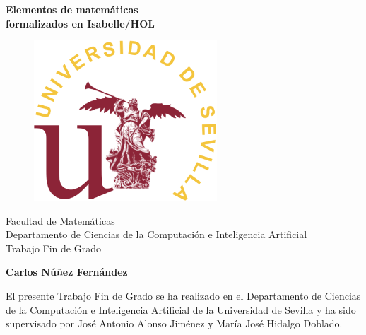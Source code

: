 \documentclass[12pt,a4paper,twoside]{book}
\begin{document}

\begin{titlepage}
 \vspace*{2cm}
  \begin{center}
    {\huge \textbf{Elementos de matemáticas \\ \vspace*{1em}
                   formalizados en Isabelle/HOL}}
  \end{center}
  \vspace{3cm}
  \begin{center}
    \begin{figure}[h]
    \centering
    \includegraphics[height=6cm]{sello.png}
    \end{figure}
  \vspace{3cm}
    {\normalsize Facultad de Matemáticas} \\
    {\normalsize Departamento de Ciencias de la Computación e Inteligencia Artificial}\\
    {\normalsize Trabajo Fin de Grado} \\
  \end{center}
  \begin{center}
    {\large \textbf{Carlos Núñez Fernández}}
  \end{center}
\end{titlepage}

\newpage

El presente Trabajo Fin de Grado se ha realizado en el Departamento de
Ciencias de la Computación e Inteligencia Artificial de la Universidad
de Sevilla y ha sido supervisado por José Antonio Alonso Jiménez y María
José Hidalgo Doblado.
\end{document}
